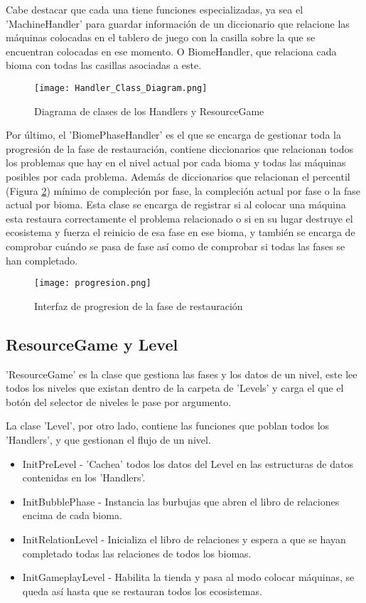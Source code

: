 Cabe destacar que cada una tiene funciones especializadas, ya sea el 'MachineHandler' para guardar información de un diccionario que relacione las máquinas colocadas en el tablero de juego con la casilla sobre la que se encuentran colocadas en ese momento. O BiomeHandler, que relaciona cada bioma con todas las casillas asociadas a este.
  
\begin{figure}[H]
    \centering
      \texttt{[image: Handler\_Class\_Diagram.png]}
    \caption{Diagrama de clases de los Handlers y ResourceGame}
    \label{fig:handlerUML}
\end{figure}


Por último, el 'BiomePhaseHandler' es el que se encarga de gestionar toda la progresión de la fase de restauración, contiene diccionarios que relacionan todos los problemas que hay en el nivel actual por cada bioma y todas las máquinas posibles por cada problema. Además de diccionarios que relacionan el percentil (Figura \ref{fig:progresion}) mínimo de compleción por fase, la compleción actual por fase o la fase actual por bioma. Esta clase se encarga de registrar si al colocar una máquina esta restaura correctamente el problema relacionado o si en su lugar destruye el ecosistema y fuerza el reinicio de esa fase en ese bioma, y también se encarga de comprobar cuándo se pasa de fase así como de comprobar si todas las fases se han completado.

\begin{figure}[H]
    \centering
      \texttt{[image: progresion.png]}
    \caption{Interfaz de progresion de la fase de restauración}
    \label{fig:progresion}
  \end{figure}

\subsection{ResourceGame y Level}

'ResourceGame' es la clase que gestiona las fases y los datos de un nivel, este lee todos los niveles que existan dentro de la carpeta de 'Levels' y carga el que el botón del selector de niveles le pase por argumento.

La clase 'Level', por otro lado, contiene las funciones que poblan todos los 'Handlers', y que gestionan el flujo de un nivel.
\begin{itemize}
    \item InitPreLevel - 'Cachea' todos los datos del Level en las estructuras de datos contenidas en los 'Handlers'.
    \item InitBubblePhase - Instancia las burbujas que abren el libro de relaciones encima de cada bioma.
    \item InitRelationLevel - Inicializa el libro de relaciones y espera a que se hayan completado todas las relaciones de todos los biomas.
    \item InitGameplayLevel - Habilita la tienda y pasa al modo colocar máquinas, se queda así hasta que se restauran todos los ecosistemas.
\end{itemize}

